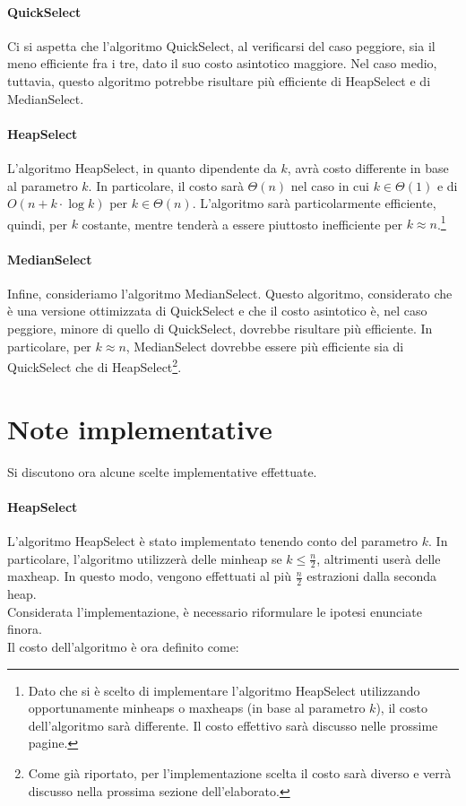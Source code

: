 \documentclass{article}
\begin{document}
	\paragraph{QuickSelect}
	Ci si aspetta che l'algoritmo QuickSelect, al verificarsi del caso peggiore, sia il meno efficiente fra i tre, dato il suo costo asintotico maggiore. Nel caso medio, tuttavia, questo algoritmo potrebbe risultare più efficiente di HeapSelect e di MedianSelect.
	
	\paragraph{HeapSelect}
	L'algoritmo HeapSelect, in quanto dipendente da $k$, avrà costo differente in base al parametro $k$.
	In particolare, il costo sarà $\Theta\left(n\right)$ nel caso in cui $k\in\Theta(1)$ e di $O\left(n + k\cdot\log{k}\right)$ per $k\in\Theta\left(n\right)$. L'algoritmo sarà particolarmente efficiente, quindi, per $k$ costante, mentre tenderà a essere piuttosto inefficiente per $k\approx n$.\footnote{Dato che si è scelto di implementare l'algoritmo HeapSelect utilizzando opportunamente minheaps o maxheaps (in base al parametro $k$), il costo dell'algoritmo sarà differente. Il costo effettivo sarà discusso nelle prossime pagine.}
	
	\paragraph{MedianSelect}
	Infine, consideriamo l'algoritmo MedianSelect. Questo algoritmo, considerato che è una versione ottimizzata di QuickSelect	e che il costo asintotico è, nel caso peggiore, minore di quello di QuickSelect, dovrebbe risultare più efficiente. In particolare, per $k\approx n$, MedianSelect dovrebbe essere più efficiente sia di QuickSelect che di HeapSelect\footnote{Come già riportato, per l'implementazione scelta il costo sarà diverso e verrà discusso nella prossima sezione dell'elaborato.}.
	
	\newpage
	
	\section{Note implementative}
	\label{section:impl_notes}
	Si discutono ora alcune scelte implementative effettuate.
	
	\paragraph{HeapSelect}
	L'algoritmo HeapSelect è stato implementato tenendo conto del parametro $k$. In particolare, l'algoritmo utilizzerà delle minheap se $k\leq \frac{n}{2}$, altrimenti userà delle maxheap. In questo modo, vengono effettuati al più $\frac{n}{2}$ estrazioni dalla seconda heap. \\ Considerata l'implementazione, è necessario riformulare le ipotesi enunciate finora. \\ Il costo dell'algoritmo è ora definito come:
	
\end{document}
